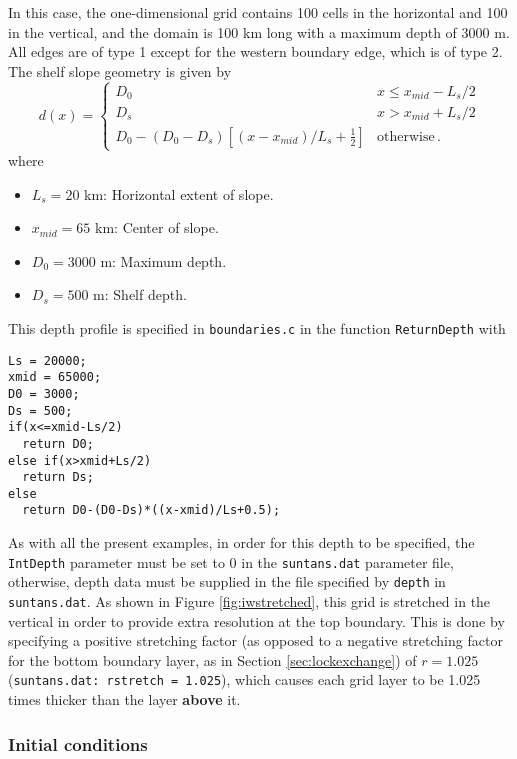 \medskip
\noindent
In this case, the one-dimensional grid contains 100 cells in the horizontal and 100 in the vertical, and
the domain is 100 km long with a maximum depth of 3000 m.  All edges are of type 1 except for the western
boundary edge, which is of type 2.
The shelf slope geometry is given by
\[
d(x) = \left\{\begin{array}{ll}
D_0 & x\le x_{mid}-L_s/2\\
D_s & x> x_{mid}+L_s/2\\
D_0 - \left(D_0-D_s\right)\left[(x-x_{mid})/L_s+\frac{1}{2}\right] & \mbox{otherwise}\,.
\end{array}\right.
\]
where
\begin{itemize}
\item[] $L_s=20$ km: Horizontal extent of slope.
\item[] $x_{mid}=65$ km: Center of slope.
\item[] $D_0=3000$ m: Maximum depth.
\item[] $D_s=500$ m: Shelf depth.
\end{itemize}
This depth profile is specified in \verb+boundaries.c+ in the function \verb+ReturnDepth+ with
\begin{verbatim}
Ls = 20000;
xmid = 65000;
D0 = 3000;
Ds = 500;
if(x<=xmid-Ls/2)
  return D0;
else if(x>xmid+Ls/2)
  return Ds;
else
  return D0-(D0-Ds)*((x-xmid)/Ls+0.5);
\end{verbatim}
As with all the present examples, in order for this depth to be specified, the \verb+IntDepth+ parameter must
be set to 0 in the \verb+suntans.dat+ parameter file, otherwise, depth data must be supplied in the
file specified by \verb+depth+ in \verb+suntans.dat+.  As shown in Figure \ref{fig:iwstretched},
this grid is stretched in the
vertical in order to provide extra resolution at the top boundary.  This is done by
specifying a positive stretching factor (as opposed to a negative stretching factor for the
bottom boundary layer, as in Section \ref{sec:lockexchange}) of $r=1.025$ (\verb+suntans.dat: rstretch = 1.025+),
which causes each grid layer to be 1.025 times thicker than the layer {\bf above} it.  

\subsubsection{Initial conditions}

